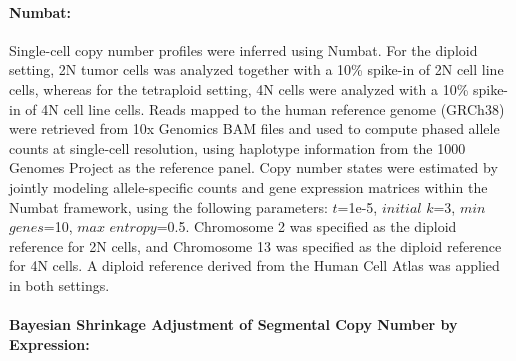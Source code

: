 \documentclass[11pt,notitlepage]{article}
\begin{document}
\paragraph{Numbat:} Single-cell copy number profiles were inferred using Numbat. For the diploid setting, 2N tumor cells was analyzed together with a 10\% spike-in of 2N cell line cells, whereas for the tetraploid setting, 4N cells were analyzed with a 10\% spike-in of 4N cell line cells. Reads mapped to the human reference genome (GRCh38) were retrieved from 10x Genomics BAM files and used to compute phased allele counts at single-cell resolution, using haplotype information from the 1000 Genomes Project as the reference panel. Copy number states were estimated by jointly modeling allele-specific counts and gene expression matrices within the Numbat framework, using the following parameters: $t$=1e-5, $initial$ $k$=3, $min$ $genes$=10, $max$ $entropy$=0.5. Chromosome 2 was specified as the diploid reference for 2N cells, and Chromosome 13 was specified as the diploid reference for 4N cells. A diploid reference derived from the Human Cell Atlas was applied in both settings.

\paragraph{Bayesian Shrinkage Adjustment of Segmental Copy Number by Expression:}
\end{document}
